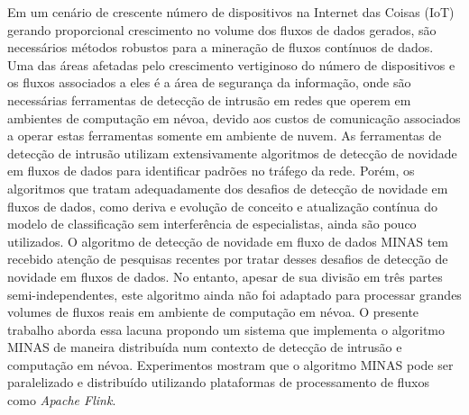 \begin{resumo}

    Em um cenário de crescente número de dispositivos na Internet das Coisas
    (IoT) gerando proporcional crescimento no volume dos fluxos de dados
    gerados, são necessários métodos robustos para a mineração de fluxos
    contínuos de dados.
    Uma das áreas afetadas pelo crescimento vertiginoso do número de
    dispositivos e os fluxos associados a eles é a área de segurança da
    informação, onde são necessárias ferramentas de detecção de intrusão em
    redes que operem em ambientes de computação em névoa, devido aos custos de
    comunicação associados a operar estas ferramentas somente em ambiente de
    nuvem.
    As ferramentas de detecção de intrusão utilizam extensivamente algoritmos de
    detecção de novidade em fluxos de dados para identificar padrões no tráfego
    da rede.
    Porém, os algoritmos que tratam adequadamente dos desafios de detecção de
    novidade em fluxos de dados, como deriva e evolução de conceito e
    atualização contínua do modelo de classificação sem interferência de
    especialistas, ainda são pouco utilizados.
    O algoritmo de detecção de novidade em fluxo de dados MINAS tem recebido
    atenção de pesquisas recentes por tratar desses desafios de detecção de novidade
    em fluxos de dados.
    No entanto, apesar de sua divisão em três partes semi-independentes, este
    algoritmo ainda não foi adaptado para processar grandes volumes de fluxos
    reais em ambiente de computação em névoa.
    O presente trabalho aborda essa lacuna propondo um sistema
    que implementa o algoritmo MINAS de maneira distribuída num contexto
    de detecção de intrusão e computação em névoa.
    Experimentos mostram que o algoritmo MINAS pode ser paralelizado e
    distribuído utilizando plataformas de processamento de fluxos como
    \emph{Apache Flink}.


\end{resumo}

